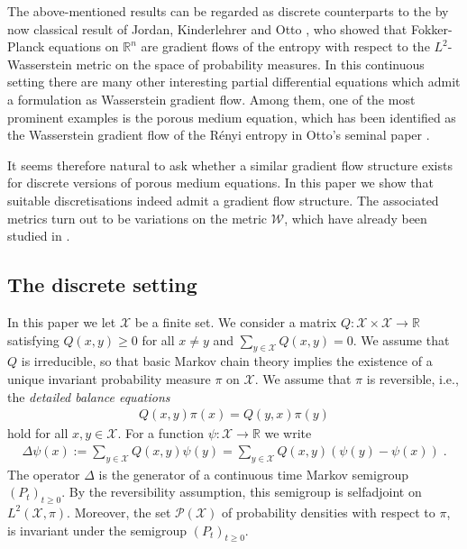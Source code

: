 \documentclass[a4paper,11pt,reqno]{amsart}
\theoremstyle{plain}
\theoremstyle{remark}
\numberwithin{equation}{section}
\begin{document}
The above-mentioned results can be regarded as discrete counterparts
to the by now classical result of Jordan, Kinderlehrer and Otto
\cite{JKO98}, who showed that Fokker-Planck equations on ${{\mathbb R}}^n$ are
gradient flows of the entropy with respect to the $L^2$-Wasserstein
metric on the space of probability measures. In this continuous
setting there are many other interesting partial differential
equations which admit a formulation as Wasserstein gradient
flow. Among them, one of the most prominent examples is the porous
medium equation, which has been identified as the Wasserstein gradient
flow of the R\'enyi entropy in Otto's seminal paper \cite{O01}.

It seems therefore natural to ask whether a similar gradient flow
structure exists for discrete versions of porous medium equations. In
this paper we show that suitable discretisations indeed admit a
gradient flow structure. The associated metrics turn out to be
variations on the metric ${\mathcal{W}}$, which have already been studied in
\cite{Ma11}.

\subsection{The discrete setting}

In this paper we let ${\mathcal{X}}$ be a finite set. We consider a matrix $Q :
{\mathcal{X}} \times {\mathcal{X}} \to {{\mathbb R}}$ satisfying $Q(x,y) \geq 0$ for all $x \neq y$
and $\sum_{y \in {\mathcal{X}}} Q(x,y) = 0$. We assume that $Q$ is irreducible,
so that basic Markov chain theory implies the existence of a unique
invariant probability measure $\pi$ on ${\mathcal{X}}$. We assume that $\pi$ is
reversible, i.e., the \emph{detailed balance equations}
\begin{align}\label{eq:detailed-balance-intro}
 Q(x,y)\pi(x) = Q(y,x)\pi(y)
\end{align}
hold for all $x, y \in {\mathcal{X}}$. 
For a function $\psi : {\mathcal{X}} \to {{\mathbb R}}$ we write
\begin{align}\label{eq:discrete-Laplace}
 \Delta \psi(x) := \sum_{y \in {\mathcal{X}}} Q(x,y) \psi(y)
            = \sum_{y \in {\mathcal{X}}} Q(x,y) (\psi(y) - \psi(x))\;.
\end{align}
The operator $\Delta$ is the generator of a continuous time Markov
semigroup $(P_t)_{t \geq 0}$. By the reversibility assumption, this
semigroup is selfadjoint on $L^2({\mathcal{X}},\pi)$. Moreover, the set ${{\mathscr{P}}({\mathcal{X}})}$ of
probability densities with respect to $\pi$, 
is invariant under the semigroup $(P_t)_{t \geq 0}$. 
\end{document}
